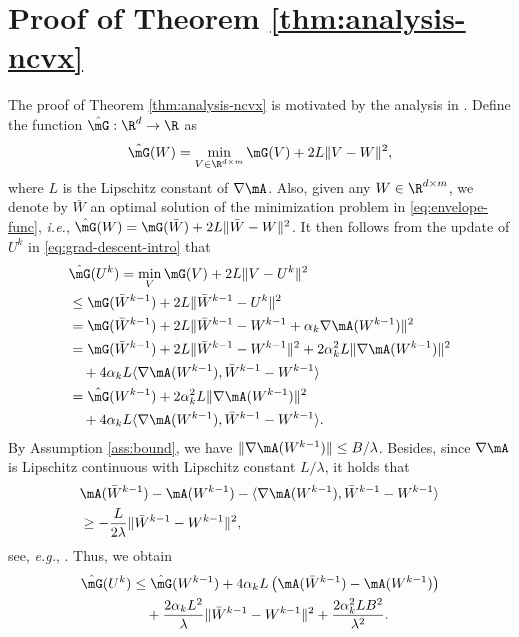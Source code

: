 \section{Proof of Theorem \ref{thm:analysis-ncvx}}\label{sec:analysis-ncvx}
The proof of Theorem \ref{thm:analysis-ncvx} is motivated by the analysis in \cite{li2019incremental}. Define the function $\hat{\mG}:\R^d\rightarrow\R$ as
\begin{equation}
    \label{eq:envelope-func}
    \hat{\mG}(W) = \min_{V\in\R^{d\times m}} \mG(V) + 2L\|V - W\|^2,
\end{equation}
where $L$ is the Lipschitz constant of $\nabla \mA$. Also, given any $W\in\R^{d\times m}$, we denote by $\bar{W}$ an optimal solution of the minimization problem in \eqref{eq:envelope-func}, {\it i.e.}, $ \hat{\mG}(W) = \mG(\bar{W}) + 2L\|\bar{W} - W\|^2$. 
It then follows from the update of $U^k$ in \eqref{eq:grad-descent-intro} that
\begin{align*}
& \hat{\mG}(U^k) = \min_V \mG(V) + 2L\|V - U^k\|^2 \\
& \leq \mG(\bar{W}^{k-1}) + 2L\|\bar{W}^{k-1} - U^k\|^2 \\
& = \mG(\bar{W}^{k-1}) + 2L\|\bar{W}^{k-1} - W^{k-1} + \alpha_k\nabla \mA(W^{k-1})\|^2 \\
& = \mG(\bar{W}^{k-1}) + 2L\|\bar{W}^{k-1} - W^{k-1}\|^2 + 2\alpha_k^2L\|\nabla \mA(W^{k-1})\|^2 \\
& \quad + 4\alpha_kL\langle \nabla\mA(W^{k-1}), \bar{W}^{k-1} - W^{k-1}\rangle  \\
& = \hat{\mG}(W^{k-1}) + 2\alpha_k^2L\|\nabla \mA(W^{k-1})\|^2 \\
& \quad + 4\alpha_kL\langle \nabla\mA(W^{k-1}), \bar{W}^{k-1} - W^{k-1}\rangle.
\end{align*}
By Assumption \ref{ass:bound}, we have $\|\nabla\mA(W^{k-1})\|\leq B/\lambda$. Besides, since $\nabla \mA$ is Lipschitz continuous with Lipschitz constant $L/\lambda$, it holds that
$$ 
\begin{aligned}
& \mA(\bar{W}^{k-1}) - \mA(W^{k-1}) - \langle \nabla\mA(W^{k-1}), \bar{W}^{k-1} - W^{k-1}\rangle \\
& \geq -\frac{L}{2\lambda}\|\bar{W}^{k-1} - W^{k-1}\|^2, 
\end{aligned}
$$
see, {\it e.g.}, \cite{nesterov2013introductory}. Thus, we obtain
\begin{equation}
\label{eq:decrease-D}
\begin{aligned}
\hat{\mG}(U^k) & \leq \hat{\mG}(W^{k-1}) + 4\alpha_kL\left(\mA(\bar{W}^{k-1}) - \mA(W^{k-1})\right) \\
& \quad + \frac{2\alpha_kL^2}{\lambda}\|\bar{W}^{k-1} - W^{k-1}\|^2 + \frac{2\alpha_k^2LB^2}{\lambda^2}. 
\end{aligned}
\end{equation}

